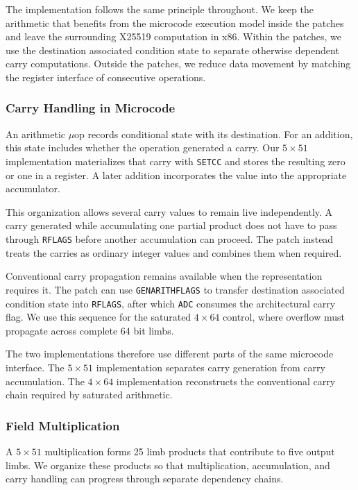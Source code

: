 \documentclass[journal=tches,submission]{iacrtrans}
\newcommand{\code}[1]{\texttt{#1}}
\newcommand{\uop}[1]{\code{\textmu#1}}%
\begin{document}
The implementation follows the same principle throughout.
We keep the arithmetic that benefits from the microcode execution model inside the patches and leave the surrounding X25519 computation in x86.
Within the patches, we use the destination associated condition state to separate otherwise dependent carry computations.
Outside the patches, we reduce data movement by matching the register interface of consecutive operations.

\subsubsection{Carry Handling in Microcode}
\label{sec}

An arithmetic $\mu$op records conditional state with its destination.
For an addition, this state includes whether the operation generated a carry.
Our $5\times51$ implementation materializes that carry with \uop{SETCC} and stores the resulting zero or one in a register.
A later addition incorporates the value into the appropriate accumulator.

This organization allows several carry values to remain live independently.
A carry generated while accumulating one partial product does not have to pass through \code{RFLAGS} before another accumulation can proceed.
The patch instead treats the carries as ordinary integer values and combines them when required.

Conventional carry propagation remains available when the representation requires it.
The patch can use \uop{GENARITHFLAGS} to transfer destination associated condition state into \code{RFLAGS}, after which \uop{ADC} consumes the architectural carry flag.
We use this sequence for the saturated $4\times64$ control, where overflow must propagate across complete 64 bit limbs.

The two implementations therefore use different parts of the same microcode interface.
The $5\times51$ implementation separates carry generation from carry accumulation.
The $4\times64$ implementation reconstructs the conventional carry chain required by saturated arithmetic.

\subsubsection{Field Multiplication}
\label{sec}

A $5\times51$ multiplication forms 25 limb products that contribute to five output limbs.
We organize these products so that multiplication, accumulation, and carry handling can progress through separate dependency chains.
\end{document}
